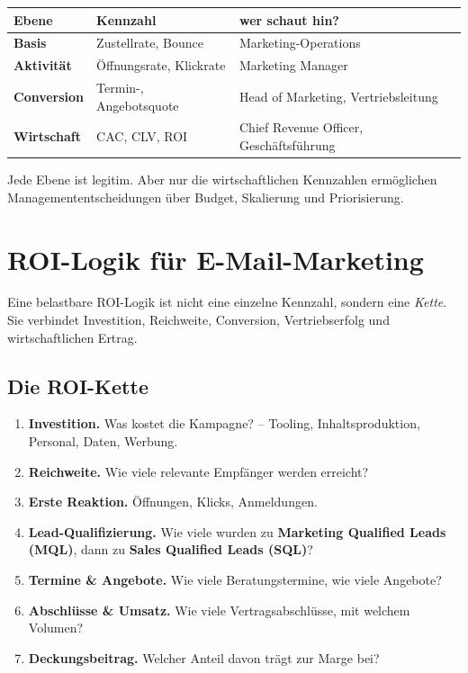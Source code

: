 \documentclass[11pt,a4paper,oneside]{article}
\newcommand{\fachbegriff}[1]{\textbf{#1}}
\begin{document}
\begin{merkbox}
\begin{tabularx}{\linewidth}{@{}>{\bfseries}l X X@{}}
\toprule
Ebene & Kennzahl & wer schaut hin? \\
\midrule
Basis & Zustellrate, Bounce & Marketing-Operations \\
Aktivität & Öffnungsrate, Klickrate & Marketing Manager \\
Conversion & Termin-, Angebotsquote & Head of Marketing, Vertriebsleitung \\
Wirtschaft & CAC, CLV, ROI & Chief Revenue Officer, Geschäftsführung \\
\bottomrule
\end{tabularx}
\medskip
\noindent Jede Ebene ist legitim. Aber nur die wirtschaftlichen Kennzahlen ermöglichen Managemententscheidungen über Budget, Skalierung und Priorisierung.
\end{merkbox}

\section{ROI-Logik für E-Mail-Marketing}

Eine belastbare ROI-Logik ist nicht eine einzelne Kennzahl, sondern eine \emph{Kette}. Sie verbindet Investition, Reichweite, Conversion, Vertriebserfolg und wirtschaftlichen Ertrag.

\subsection{Die ROI-Kette}

\begin{enumerate}
  \item \textbf{Investition.} Was kostet die Kampagne? -- Tooling, Inhaltsproduktion, Personal, Daten, Werbung.
  \item \textbf{Reichweite.} Wie viele relevante Empfänger werden erreicht?
  \item \textbf{Erste Reaktion.} Öffnungen, Klicks, Anmeldungen.
  \item \textbf{Lead-Qualifizierung.} Wie viele wurden zu \fachbegriff{Marketing Qualified Leads (MQL)}, dann zu \fachbegriff{Sales Qualified Leads (SQL)}?
  \item \textbf{Termine \& Angebote.} Wie viele Beratungstermine, wie viele Angebote?
  \item \textbf{Abschlüsse \& Umsatz.} Wie viele Vertragsabschlüsse, mit welchem Volumen?
  \item \textbf{Deckungsbeitrag.} Welcher Anteil davon trägt zur Marge bei?
\end{enumerate}
\end{document}
